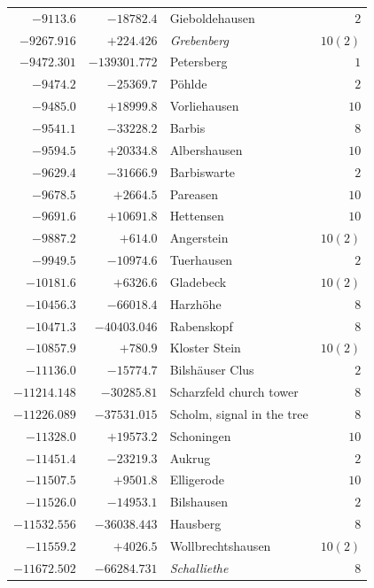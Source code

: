 \begin{center}
\begin{tabular}{r|r|p{170pt}|r}
\(-9113.6\)&\(-18782.4\)&Gieboldehausen&\(2\)\\
\(-9267.916\)&\(+224.426\)&\textit{Grebenberg}&\(10 (2)\)\\
\(-9472.301\)&\(-139301.772\)&Petersberg&\(1\)\\
\(-9474.2\)&\(-25369.7\)&Pöhlde&\(2\)\\
\(-9485.0\)&\(+18999.8\)&Vorliehausen&\(10\)\\
\(-9541.1\)&\(-33228.2\)&Barbis&\(8\)\\
\(-9594.5\)&\(+20334.8\)&Albershausen&\(10\)\\
\(-9629.4\)&\(-31666.9\)&Barbiswarte&\(2\)\\
\(-9678.5\)&\(+2664.5\)&Pareasen&\(10\)\\
\(-9691.6\)&\(+10691.8\)&Hettensen&\(10\)\\
\(-9887.2\)&\(+614.0\)&Angerstein&\(10 (2)\)\\
\(-9949.5\)&\(-10974.6\)&Tuerhausen&\(2\)\\
\(-10181.6\)&\(+6326.6\)&Gladebeck&\(10 (2)\)\\
\(-10456.3\)&\(-66018.4\)&Harzhöhe&\(8\)\\
\(-10471.3\)&\(-40403.046\)&Rabenskopf&\(8\)\\
\(-10857.9\)&\(+780.9\)&Kloster Stein&\(10 (2)\)\\
\(-11136.0\)&\(-15774.7\)&Bilshäuser Clus&\(2\)\\
\(-11214.148\)&\(-30285.81\)&Scharzfeld church tower&\(8\)\\
\(-11226.089\)&\(-37531.015\)&Scholm, signal in the tree&\(8\)\\
\(-11328.0\)&\(+19573.2\)&Schoningen&\(10\)\\
\(-11451.4\)&\(-23219.3\)&Aukrug&\(2\)\\
\(-11507.5\)&\(+9501.8\)&Elligerode&\(10\)\\
\(-11526.0\)&\(-14953.1\)&Bilshausen&\(2\)\\
\(-11532.556\)&\(-36038.443\)&Hausberg&\(8\)\\
\(-11559.2\)&\(+4026.5\)&Wollbrechtshausen&\(10 (2)\)\\
\(-11672.502\)&\(-66284.731\)&\textit{Schalliethe}&\(8\)\\
\hline\end{tabular}\endgroup\end{center}
